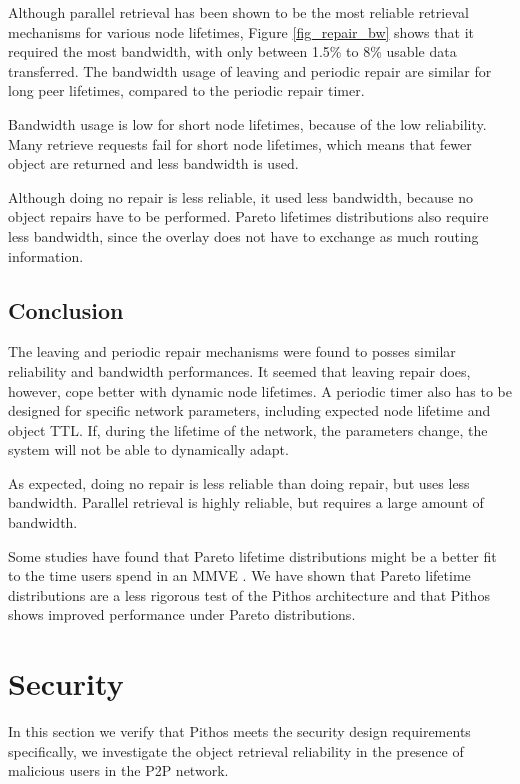 Although parallel retrieval has been shown to be the most reliable retrieval mechanisms for various node lifetimes, Figure \ref{fig_repair_bw} shows that it required the most bandwidth, with only between 1.5\% to 8\% usable data transferred. The bandwidth usage of leaving and periodic repair are similar for long peer lifetimes, compared to the periodic repair timer.

Bandwidth usage is low for short node lifetimes, because of the low reliability. Many retrieve requests fail for short node lifetimes, which means that fewer object are returned and less bandwidth is used.

Although doing no repair is less reliable, it used less bandwidth, because no object repairs have to be performed. Pareto lifetimes distributions also require less bandwidth, since the overlay does not have to exchange as much routing information.

\subsection{Conclusion}

The leaving and periodic repair mechanisms were found to posses similar reliability and bandwidth performances. It seemed that leaving repair does, however, cope better with dynamic node lifetimes. A periodic timer also has to be designed for specific network parameters, including expected node lifetime and object TTL. If, during the lifetime of the network, the parameters change, the system will not be able to dynamically adapt.

As expected, doing no repair is less reliable than doing repair, but uses less bandwidth. Parallel retrieval is highly reliable, but requires a large amount of bandwidth.

Some studies have found that Pareto lifetime distributions might be a better fit to the time users spend in an MMVE \cite{}. We have shown that Pareto lifetime distributions are a less rigorous test of the Pithos architecture and that Pithos shows improved performance under Pareto distributions.

\section{Security}
\label{malicious_results}

In this section we verify that Pithos meets the security design requirements specifically, we investigate the object retrieval reliability in the presence of malicious users in the P2P network.

